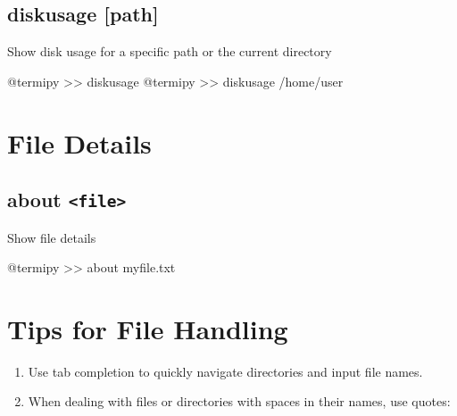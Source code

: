\documentclass[
  letterpaper,
  DIV=11,
  numbers=noendperiod]{scrreprt}
\newenvironment{Shaded}{\begin{snugshade}}{\end{snugshade}}
\newcommand{\ExtensionTok}[1]{\textcolor[rgb]{0.00,0.23,0.31}{#1}}
\newcommand{\NormalTok}[1]{\textcolor[rgb]{0.00,0.23,0.31}{#1}}
\newcommand{\OperatorTok}[1]{\textcolor[rgb]{0.37,0.37,0.37}{#1}}
\providecommand{\tightlist}{%
  \setlength{\itemsep}{0pt}\setlength{\parskip}{0pt}}\usepackage{longtable,booktabs,array}
\begin{document}

\subsection*{diskusage {[}path{]}}\label{diskusage-path}

Show disk usage for a specific path or the current directory

\begin{Shaded}
\begin{Highlighting}[]
\ExtensionTok{@termipy} \OperatorTok{\textgreater{}\textgreater{}}\NormalTok{ diskusage}
\ExtensionTok{@termipy} \OperatorTok{\textgreater{}\textgreater{}}\NormalTok{ diskusage /home/user}
\end{Highlighting}
\end{Shaded}

\section*{File Details}\label{file-details}


\subsection*{\texorpdfstring{about
\texttt{\textless{}file\textgreater{}}}{about \textless file\textgreater{}}}\label{about-file}

Show file details

\begin{Shaded}
\begin{Highlighting}[]
\ExtensionTok{@termipy} \OperatorTok{\textgreater{}\textgreater{}}\NormalTok{ about myfile.txt}
\end{Highlighting}
\end{Shaded}

\section*{Tips for File Handling}\label{tips-for-file-handling}


\begin{enumerate}
\def\labelenumi{\arabic{enumi}.}
\tightlist
\item
  Use tab completion to quickly navigate directories and input file
  names.
\item
  When dealing with files or directories with spaces in their names, use
  quotes:
\end{enumerate}
\end{document}
